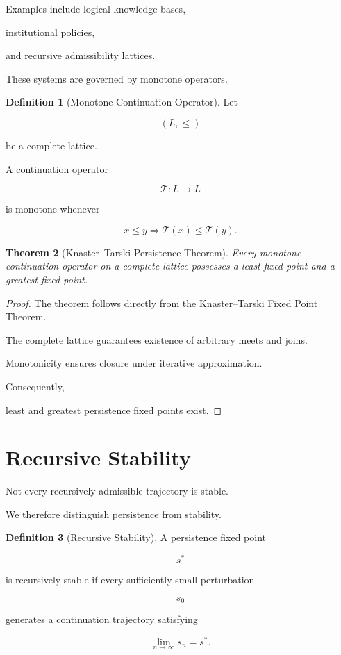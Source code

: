 \documentclass[11pt]{book}
\numberwithin{equation}{chapter}
\theoremstyle{definition}
\newtheorem{definition}{Definition}[chapter]
\theoremstyle{plain}
\newtheorem{theorem}[definition]{Theorem}
\begin{document}
Examples include logical knowledge bases,

institutional policies,

and recursive admissibility lattices.

These systems are governed by monotone operators.

\begin{definition}[Monotone Continuation Operator]

Let

\[
(L,\le)
\]

be a complete lattice.

A continuation operator

\[
\mathcal T:L\rightarrow L
\]

is monotone whenever

\[
x\le y
\Longrightarrow
\mathcal T(x)
\le
\mathcal T(y).
\]

\end{definition}

\begin{theorem}[Knaster--Tarski Persistence Theorem]

Every monotone continuation operator on a complete lattice possesses a
least fixed point and a greatest fixed point.

\end{theorem}

\begin{proof}

The theorem follows directly from the
Knaster--Tarski Fixed Point Theorem.

The complete lattice guarantees existence of arbitrary meets and joins.

Monotonicity ensures closure under iterative approximation.

Consequently,

least and greatest persistence fixed points exist.

\end{proof}

\section{Recursive Stability}

Not every recursively admissible trajectory is stable.

We therefore distinguish persistence from stability.

\begin{definition}[Recursive Stability]

A persistence fixed point

\[
s^*
\]

is recursively stable if every sufficiently small perturbation

\[
s_0
\]

generates a continuation trajectory satisfying

\[
\lim_{n\rightarrow\infty}
s_n
=
s^*.
\]

\end{definition}
\end{document}

